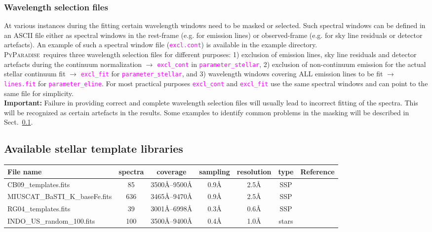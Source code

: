 \documentclass[usenatbib,usegraphicx,useAMS,onecolumn]{mn2e}
\newcommand{\codeline}[1]{\lstinline|#1|}
\newcommand{\fname}[1]{\textcolor{magenta}{\codeline{#1}}}
\newcommand{\PyPar}{\mbox{\textsc{PyParadise}}}
\begin{document}
\subsubsection{Wavelength selection files}
At various instances during the fitting certain wavelength windows need to be masked or selected. Such spectral windows can be defined in an ASCII file either as spectral windows in the rest-frame (e.g. for emission lines) or observed-frame (e.g. for sky line residuals or detector artefacts). An example of such a spectral window file (\fname{excl.cont}) is available in the example directory.\bigskip\\

\PyPar\ requires three wavelength selection files for different purposes: 1) exclusion of emission lines, sky line residuals and detector artefacts during the continuum normalization $\rightarrow$ \fname{excl_cont} in \fname{parameter_stellar}, 2) exclusion of non-continuum emission for the actual stellar continuum fit $\rightarrow$ \fname{excl_fit} for \fname{parameter_stellar}, and 3) wavelength windows covering ALL emission lines to be fit $\rightarrow$ \fname{lines.fit} for \fname{parameter_eline}.  For most practical purposes \fname{excl_cont} and \fname{excl_fit} use the same spectral windows and can point to the same file for simplicity.\bigskip\\
\textbf{Important:} Failure in providing correct and complete wavelength selection files will usually lead to incorrect fitting of the spectra. This will be recognized as certain artefacts in the results. Some examples to identify common problems in the masking will be described in Sect.~\ref{}. 



\subsection{Available stellar template libraries}

\begin{tabular}{|l|c|c|c|c|c|c|}
 File name                     & spectra & coverage           & sampling & resolution & type & Reference\\\hline
 CB09\_templates.fits          &   85    &  3500\AA--9500\AA  & 0.9\AA   &  2.5\AA    & SSP  &          \\
 MIUSCAT\_BaSTI\_K\_baseFe.fits&   636   &  3465\AA--9470\AA  & 0.9\AA   &  2.5\AA    & SSP  &          \\
 RG04\_templates.fits          &    39   &  3001\AA--6998\AA  & 0.3\AA   &  0.6\AA    & SSP  &          \\
 INDO\_US\_random\_100.fits    &   100   &  3500\AA--9400\AA  & 0.4\AA   &  1.0\AA    & stars&    
\end{tabular}
\end{document}
